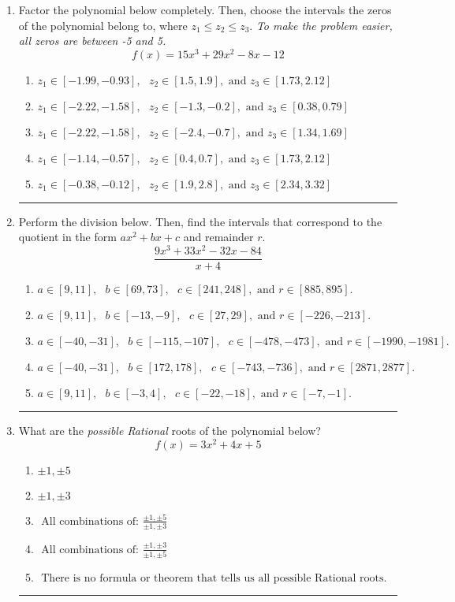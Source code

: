 \documentclass[14pt]{extbook}
\newcommand{\litem}[1]{\item#1\hspace*{-1cm}\rule{\textwidth}{0.4pt}}
\begin{document}
\begin{enumerate}
\litem{
Factor the polynomial below completely. Then, choose the intervals the zeros of the polynomial belong to, where $z_1 \leq z_2 \leq z_3$. \textit{To make the problem easier, all zeros are between -5 and 5.}\[ f(x) = 15x^{3} +29 x^{2} -8 x -12 \]\begin{enumerate}[label=\Alph*.]
\item \( z_1 \in [-1.99, -0.93], \text{   }  z_2 \in [1.5, 1.9], \text{   and   } z_3 \in [1.73, 2.12] \)
\item \( z_1 \in [-2.22, -1.58], \text{   }  z_2 \in [-1.3, -0.2], \text{   and   } z_3 \in [0.38, 0.79] \)
\item \( z_1 \in [-2.22, -1.58], \text{   }  z_2 \in [-2.4, -0.7], \text{   and   } z_3 \in [1.34, 1.69] \)
\item \( z_1 \in [-1.14, -0.57], \text{   }  z_2 \in [0.4, 0.7], \text{   and   } z_3 \in [1.73, 2.12] \)
\item \( z_1 \in [-0.38, -0.12], \text{   }  z_2 \in [1.9, 2.8], \text{   and   } z_3 \in [2.34, 3.32] \)

\end{enumerate} }
\litem{
Perform the division below. Then, find the intervals that correspond to the quotient in the form $ax^2+bx+c$ and remainder $r$.\[ \frac{9x^{3} +33 x^{2} -32 x -84}{x + 4} \]\begin{enumerate}[label=\Alph*.]
\item \( a \in [9, 11], \text{   } b \in [69, 73], \text{   } c \in [241, 248], \text{   and   } r \in [885, 895]. \)
\item \( a \in [9, 11], \text{   } b \in [-13, -9], \text{   } c \in [27, 29], \text{   and   } r \in [-226, -213]. \)
\item \( a \in [-40, -31], \text{   } b \in [-115, -107], \text{   } c \in [-478, -473], \text{   and   } r \in [-1990, -1981]. \)
\item \( a \in [-40, -31], \text{   } b \in [172, 178], \text{   } c \in [-743, -736], \text{   and   } r \in [2871, 2877]. \)
\item \( a \in [9, 11], \text{   } b \in [-3, 4], \text{   } c \in [-22, -18], \text{   and   } r \in [-7, -1]. \)

\end{enumerate} }
\litem{
What are the \textit{possible Rational} roots of the polynomial below?\[ f(x) = 3x^{2} +4 x + 5 \]\begin{enumerate}[label=\Alph*.]
\item \( \pm 1,\pm 5 \)
\item \( \pm 1,\pm 3 \)
\item \( \text{ All combinations of: }\frac{\pm 1,\pm 5}{\pm 1,\pm 3} \)
\item \( \text{ All combinations of: }\frac{\pm 1,\pm 3}{\pm 1,\pm 5} \)
\item \( \text{ There is no formula or theorem that tells us all possible Rational roots.} \)


\end{enumerate}}
\end{enumerate}
\end{document}
